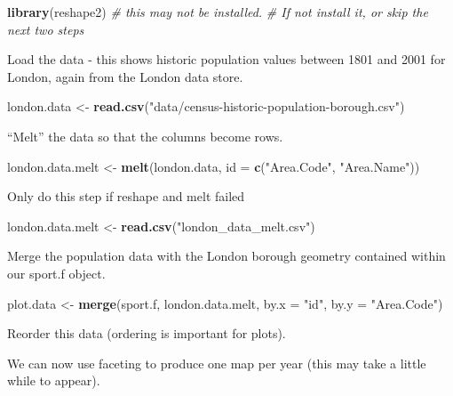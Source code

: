 \documentclass[]{article}
\newenvironment{Shaded}{}{}
\newcommand{\KeywordTok}[1]{\textcolor[rgb]{0.00,0.44,0.13}{\textbf{{#1}}}}
\newcommand{\DataTypeTok}[1]{\textcolor[rgb]{0.56,0.13,0.00}{{#1}}}
\newcommand{\StringTok}[1]{\textcolor[rgb]{0.25,0.44,0.63}{{#1}}}
\newcommand{\CommentTok}[1]{\textcolor[rgb]{0.38,0.63,0.69}{\textit{{#1}}}}
\newcommand{\NormalTok}[1]{{#1}}
\begin{document}
\begin{Shaded}
\begin{Highlighting}[]
\KeywordTok{library}\NormalTok{(reshape2)  }\CommentTok{# this may not be installed. }
\CommentTok{# If not install it, or skip the next two steps}
\end{Highlighting}
\end{Shaded}
Load the data - this shows historic population values between 1801 and
2001 for London, again from the London data store.

\begin{Shaded}
\begin{Highlighting}[]
\NormalTok{london.data <- }\KeywordTok{read.csv}\NormalTok{(}\StringTok{"data/census-historic-population-borough.csv"}\NormalTok{)}
\end{Highlighting}
\end{Shaded}
``Melt'' the data so that the columns become rows.

\begin{Shaded}
\begin{Highlighting}[]
\NormalTok{london.data.melt <- }\KeywordTok{melt}\NormalTok{(london.data, }\DataTypeTok{id =} \KeywordTok{c}\NormalTok{(}\StringTok{"Area.Code"}\NormalTok{, }\StringTok{"Area.Name"}\NormalTok{))}
\end{Highlighting}
\end{Shaded}
Only do this step if reshape and melt failed

\begin{Shaded}
\begin{Highlighting}[]
\NormalTok{london.data.melt <- }\KeywordTok{read.csv}\NormalTok{(}\StringTok{"london_data_melt.csv"}\NormalTok{)}
\end{Highlighting}
\end{Shaded}
Merge the population data with the London borough geometry contained
within our sport.f object.

\begin{Shaded}
\begin{Highlighting}[]
\NormalTok{plot.data <- }\KeywordTok{merge}\NormalTok{(sport.f, london.data.melt, }\DataTypeTok{by.x =} \StringTok{"id"}\NormalTok{, }\DataTypeTok{by.y =} \StringTok{"Area.Code"}\NormalTok{)}
\end{Highlighting}
\end{Shaded}
Reorder this data (ordering is important for plots).

\begin{Shaded}
\end{Shaded}
We can now use faceting to produce one map per year (this may take a
little while to appear).
\end{document}
